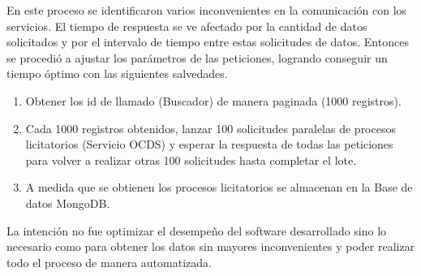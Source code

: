 En este proceso se identificaron varios inconvenientes en la comunicación con los servicios. El tiempo de respuesta se ve afectado por la cantidad de datos solicitados y por el intervalo de tiempo entre estas solicitudes de datos. Entonces se procedió a ajustar los parámetros de las peticiones, logrando conseguir un tiempo óptimo con las siguientes salvedades.

\begin{enumerate}

    \item Obtener los id de llamado (Buscador) de manera paginada (1000 registros).
    \item Cada 1000 registros obtenidos, lanzar 100 solicitudes paralelas de procesos licitatorios (Servicio OCDS) y esperar la respuesta de todas las peticiones para volver a realizar otras 100 solicitudes hasta completar el lote.
    \item A medida que se obtienen los procesos licitatorios se almacenan en la Base de datos MongoDB.
  
\end{enumerate}

La intención no fue optimizar el desempeño del software desarrollado sino lo necesario como para obtener los datos sin mayores inconvenientes y poder realizar todo el proceso de manera automatizada.



